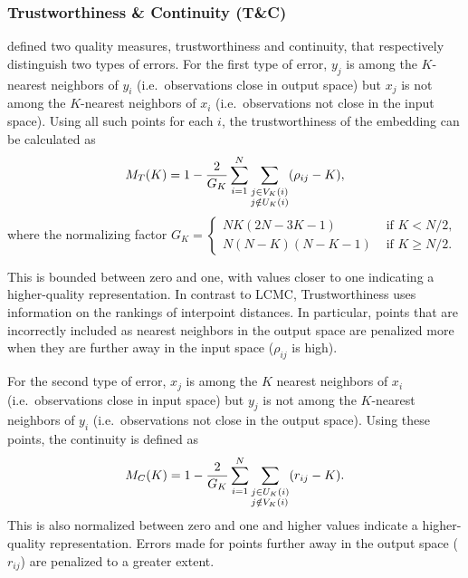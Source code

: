 \documentclass[11pt,a4paper,]{article}
\begin{document}
\hypertarget{trustworthiness-continuity-tc}{%
\subsubsection*{Trustworthiness \& Continuity (T\&C)}\label{trustworthiness-continuity-tc}}

\textcite{Venna2006-nd} defined two quality measures, trustworthiness and continuity, that respectively distinguish two types of errors. For the first type of error, \(y_j\) is among the \(K\)-nearest neighbors of \(y_i\) (i.e.~observations close in output space) but \(x_j\) is not among the \(K\)-nearest neighbors of \(x_i\) (i.e.~observations not close in the input space). Using all such points for each \(i\), the trustworthiness of the embedding can be calculated as
\begin{equation}\label{eq:trustworthiness}
  M_{T}(K)=1-\frac{2}{G_{K}} \sum_{i=1}^{N} \sum\limits_{\begin{subarray}{c}j \in V_{K}(i)\\j \notin U_{K}(i)\end{subarray}}(\rho_{ij}-K),
\end{equation}
where the normalizing factor
\(G_{K}=\left\{  \begin{array}{ll}  N K(2 N-3 K-1) & \text { if } K<N / 2, \\  N(N-K)(N-K-1) & \text { if } K \geq N / 2.  \end{array} \right.\)

This is bounded between zero and one, with values closer to one indicating a higher-quality representation. In contrast to LCMC, Trustworthiness uses information on the rankings of interpoint distances. In particular, points that are incorrectly included as nearest neighbors in the output space are penalized more when they are further away in the input space (\(\rho_{ij}\) is high).

For the second type of error, \(x_j\) is among the \(K\) nearest neighbors of \(x_i\) (i.e.~observations close in input space) but \(y_j\) is not among the \(K\)-nearest neighbors of \(y_i\) (i.e.~observations not close in the output space). Using these points, the continuity is defined as
\begin{equation}\label{eq:continuity}
  M_{C}(K)=1-\frac{2}{G_{K}} \sum_{i=1}^{N} \sum_{\begin{subarray}{\ell}j \in U_{K}(i) \\j\notin V_{K}(i)\end{subarray}}(r_{ij}-K).
\end{equation}
This is also normalized between zero and one and higher values indicate a higher-quality representation. Errors made for points further away in the output space (\(r_{ij}\)) are penalized to a greater extent.
\end{document}
